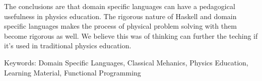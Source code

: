 The conclusions are that domain specific languages can have a pedagogical usefulness in physics education. The rigorous nature of Haskell and domain specific languages makes the process of physical problem solving with them become rigorous as well. We believe this was of thinking can further the teching if it's used in traditional physics education.













\vfill
Keywords: Domain Specific Languages, Classical Mehanics, Physics Education, Learning Material, Functional Programming


\newpage				%
\thispagestyle{empty}
\mbox{}
